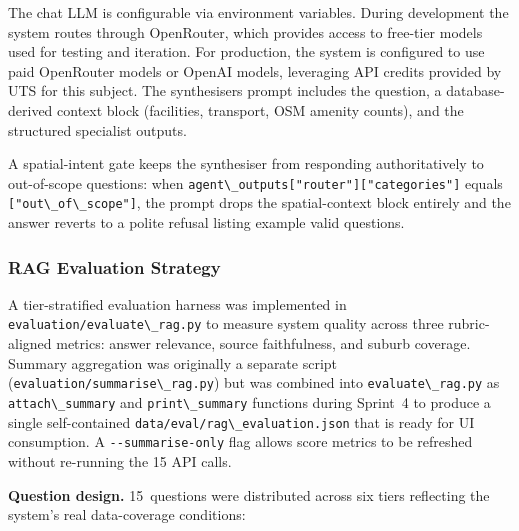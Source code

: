 \documentclass[11pt,a4paper]{article}
\newcommand{\passthrough}[1]{#1}
\begin{document}
The chat LLM is configurable via environment variables. During development the system routes through OpenRouter, which provides access to free-tier models used for testing and iteration. For production, the system is configured to use paid OpenRouter models or OpenAI models, leveraging API credits provided by UTS for this subject. The synthesiser\textquotesingle s prompt includes the question, a database-derived context block (facilities, transport, OSM amenity counts), and the structured specialist outputs.

A spatial-intent gate keeps the synthesiser from responding authoritatively to out-of-scope questions: when \passthrough{\lstinline!agent\_outputs["router"]["categories"]!} equals \passthrough{\lstinline!["out\_of\_scope"]!}, the prompt drops the spatial-context block entirely and the answer reverts to a polite refusal listing example valid questions.

\subsubsection{RAG Evaluation Strategy}\label{536-rag-evaluation-strategy}

A tier-stratified evaluation harness was implemented in \passthrough{\lstinline!evaluation/evaluate\_rag.py!} to measure system quality across three rubric-aligned metrics: answer relevance, source faithfulness, and suburb coverage. Summary aggregation was originally a separate script (\passthrough{\lstinline!evaluation/summarise\_rag.py!}) but was combined into \passthrough{\lstinline!evaluate\_rag.py!} as \passthrough{\lstinline!attach\_summary!} and \passthrough{\lstinline!print\_summary!} functions during Sprint~4 to produce a single self-contained \passthrough{\lstinline!data/eval/rag\_evaluation.json!} that is ready for UI consumption. A \passthrough{\lstinline!--summarise-only!} flag allows score metrics to be refreshed without re-running the 15 API calls.

\textbf{Question design.} 15~questions were distributed across six tiers reflecting the system's real data-coverage conditions:
\end{document}
